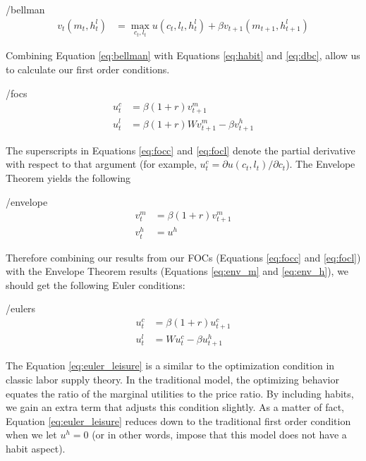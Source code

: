 \documentclass[ProjectMMD]{subfiles}
\begin{document}
\hypertarget{bellman}{}
\begin{verbatimwrite}{\EqDir/bellman}
  \begin{align}
    v_t(m_t, h_t^l) &= \max _{c_t, l_t}u(c_t, l_t, h_t^l) + \beta v_{t+1}(m_{t+1}, h_{t+1}^l) \label{eq:bellman}
  \end{align}
\end{verbatimwrite}

Combining Equation \eqref{eq:bellman} with Equations \eqref{eq:habit} and \eqref{eq:dbc}, allow us to calculate our first order conditions.


\hypertarget{focs}{}
\begin{verbatimwrite}{\EqDir/focs}
  \begin{align}
    u^c_t &=\beta(1+r)v_{t+1}^m \label{eq:focc} \\
    u^l_t &= \beta(1+r)W v_{t+1}^m - \beta v_{t+1}^h \label{eq:focl}
  \end{align}
\end{verbatimwrite}


The superscripts in Equations \eqref{eq:focc} and \eqref{eq:focl} denote the partial derivative with respect to that argument (for example, $u^c_t = \partial u(c_t,l_t) / \partial c_t$). The Envelope Theorem yields the following

\hypertarget{envelope}{}
\begin{verbatimwrite}{\EqDir/envelope}
  \begin{align}
    v_t^m &= \beta(1+r)v_{t+1}^m \label{eq:env_m} \\
    v_t^h &= u^h \label{eq:env_h}
  \end{align}
\end{verbatimwrite}

Therefore combining our results from our FOCs (Equations \eqref{eq:focc} and \eqref{eq:focl}) with the Envelope Theorem results (Equations \eqref{eq:env_m} and \eqref{eq:env_h}), we should get the following Euler conditions:

\hypertarget{eulers}{}
\begin{verbatimwrite}{\EqDir/eulers}
  \begin{align}
    u^c_t &= \beta(1+r)u^c_{t+1} \label{eq:euler_cons} \\
    u_t^l &= W u^c_t - \beta u^h_{t+1} \label{eq:euler_leisure}
  \end{align}
\end{verbatimwrite}


The Equation \eqref{eq:euler_leisure} is a similar to the optimization condition in classic labor supply theory. In the traditional model, the optimizing behavior equates the ratio of the marginal utilities to the price ratio. By including habits, we gain an extra term that adjusts this condition slightly. As a matter of fact, Equation \eqref{eq:euler_leisure} reduces down to the traditional first order condition when we let $u^h=0$ (or in other words, impose that this model does not have a habit aspect).
\end{document}
